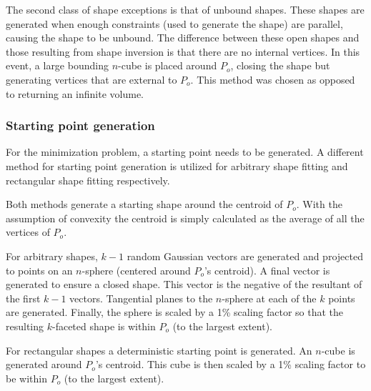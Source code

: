 The second class of shape exceptions is that of unbound shapes.
These shapes are generated when enough constraints (used to generate the shape) are parallel, causing the shape to be unbound.
The difference between these open shapes and those resulting from shape inversion is that there are no internal vertices.
In this event, a large bounding $n$-cube is placed around $P_o$, closing the shape but generating vertices that are external to $P_o$.
This method was chosen as opposed to returning an infinite volume.

\subsubsection{Starting point generation}
For the minimization problem, a starting point needs to be generated.
A different method for starting point generation is utilized for arbitrary shape fitting and rectangular shape fitting respectively.

Both methods generate a starting shape around the centroid of $P_o$.
With the assumption of convexity the centroid is simply calculated as the average of all the vertices of $P_o$.

For arbitrary shapes, $k-1$ random Gaussian vectors are generated and projected to points on an $n$-sphere (centered around $P_o$'s centroid).
A final vector is generated to ensure a closed shape.
This vector is the negative of the resultant of the first $k-1$ vectors.
Tangential planes to the $n$-sphere at each of the $k$ points are generated.
Finally, the sphere is scaled by a 1\% scaling factor so that the resulting $k$-faceted shape is within $P_o$ (to the largest extent).

For rectangular shapes a deterministic starting point is generated.
An $n$-cube is generated around $P_o$'s centroid.
This cube is then scaled by a 1\% scaling factor to be within $P_o$ (to the largest extent).



